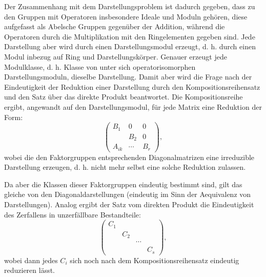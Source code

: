 Der Zusammenhang mit dem Darstellungsproblem ist dadurch gegeben, dass zu den Gruppen mit Operatoren insbesondere Ideale und Moduln gehören, diese aufgefasst als Abelsche Gruppen gegenüber der Addition, während die Operatoren durch die Multiplikation mit den Ringelementen gegeben sind. Jede Darstellung aber wird durch einen Darstellungsmodul erzeugt, d. h. durch einen Modul inbezug auf Ring und Darstellungskörper. Genauer erzeugt jede Modulklasse, d. h. Klasse von unter sich operatorisomorphen Darstellungsmoduln, dieselbe Darstellung. Damit aber wird die Frage nach der Eindeutigkeit der Reduktion einer Darstellung durch den Kompositionsreihensatz und den Satz über das direkte Produkt beantwortet. Die Kompositionsreihe ergibt, angewandt auf den Darstellungsmodul, für jede Matrix eine Reduktion der Form:
\[
\begin{pmatrix}
B_1&0&0\\
&B_2&0\\
A_{ik}&\cdots&B_r
\end{pmatrix},
\]
wobei die den Faktorgruppen entsprechenden Diagonalmatrizen eine \guillemotleft irreduzible\guillemotright{} Darstellung erzeugen, d. h. nicht mehr selbst eine solche Reduktion zulassen.

Da aber die Klassen dieser Faktorgruppen eindeutig bestimmt sind, gilt das gleiche von den Diagonaldarstellungen (eindeutig im Sinn der Aequivalenz von Darstellungen). Analog ergibt der Satz vom direkten Produkt die Eindeutigkeit des \guillemotleft Zerfallens\guillemotright{} in \guillemotleft unzerfällbare\guillemotright{} Bestandteile:
\[
\begin{pmatrix}
C_1&&&\\
&C_2&&\\
&&\cdots&\\
&&&C_s
\end{pmatrix},
\]
wobei dann jedes $C_i$ sich noch nach dem Kompositionsreihensatz eindeutig reduzieren lässt.

